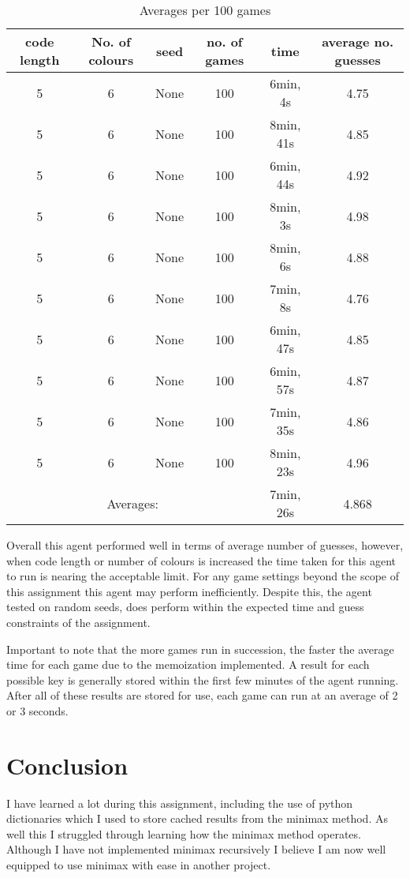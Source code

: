 \documentclass[12pt]{article}
\begin{document}
\begin{table}[htbp]
\centering
\begin{tabular}{|c|c|c|c|c|c|}
\hline
code length & No. of colours & seed & no. of games & time & average no. guesses\\\hline
5 & 6 & None & 100 & 6min, 4s & 4.75\\
5 & 6 & None & 100 & 8min, 41s & 4.85\\
5 & 6 & None & 100 & 6min, 44s & 4.92\\
5 & 6 & None & 100 & 8min, 3s & 4.98\\
5 & 6 & None & 100 & 8min, 6s & 4.88\\
5 & 6 & None & 100 & 7min, 8s & 4.76\\
5 & 6 & None & 100 & 6min, 47s & 4.85\\
5 & 6 & None & 100 & 6min, 57s & 4.87\\
5 & 6 & None & 100 & 7min, 35s & 4.86\\
5 & 6 & None & 100 & 8min, 23s & 4.96\\
\hline
\multicolumn{4}{|c|}{Averages: } & 7min, 26s & 4.868\\
\hline
\end{tabular}
\caption{\label{tab:results2}Averages per 100 games}
\end{table}

Overall this agent performed well in terms of average number of guesses, however, when code length or number of colours is increased the time taken for this agent to run is nearing the acceptable limit. For any game settings beyond the scope of this assignment this agent may perform inefficiently. Despite this, the agent tested on random seeds, does perform within the expected time and guess constraints of the assignment.

Important to note that the more games run in succession, the faster the average time for each game due to the memoization implemented. A result for each possible key is generally stored within the first few minutes of the agent running. After all of these results are stored for use, each game can run at an average of 2 or 3 seconds.


\section{Conclusion}
I have learned a lot during this assignment, including the use of python dictionaries which I used to store cached results from the minimax method. As well this I struggled through learning how the minimax method operates. Although I have not implemented minimax recursively I believe I am now well equipped to use minimax with ease in another project.
\end{document}
